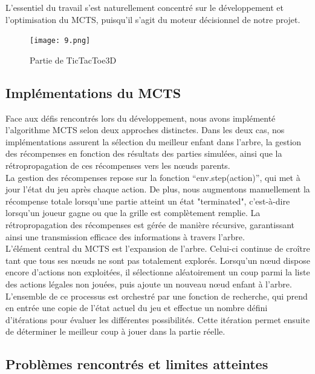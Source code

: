 \documentclass{article}
\begin{document}
\quad L'essentiel du travail s'est naturellement concentré sur le développement et l'optimisation du MCTS, puisqu'il s'agit du moteur décisionnel de notre projet.

\begin{figure}[ht]
    \centering
    \texttt{[image: 9.png]}
    \caption{Partie de TicTacToe3D}
\end{figure}

\subsection{Implémentations du MCTS}

\quad Face aux défis rencontrés lors du développement, nous avons implémenté l’algorithme MCTS selon deux approches distinctes. Dans les deux cas, nos implémentations assurent la sélection du meilleur enfant dans l’arbre, la gestion des récompenses en fonction des résultats des parties simulées, ainsi que la rétropropagation de ces récompenses vers les nœuds parents.\\

La gestion des récompenses repose sur la fonction “env.step(action)”, qui met à jour l'état du jeu après chaque action. De plus, nous augmentons manuellement la récompense totale lorsqu’une partie atteint un état "terminated", c’est-à-dire lorsqu’un joueur gagne ou que la grille est complètement remplie. La rétropropagation des récompenses est gérée de manière récursive, garantissant ainsi une transmission efficace des informations à travers l’arbre.\\

L’élément central du MCTS est l’expansion de l’arbre. Celui-ci continue de croître tant que tous ses nœuds ne sont pas totalement explorés. Lorsqu’un nœud dispose encore d’actions non exploitées, il sélectionne aléatoirement un coup parmi la liste des actions légales non jouées, puis ajoute un nouveau nœud enfant à l’arbre.\\

L’ensemble de ce processus est orchestré par une fonction de recherche, qui prend en entrée une copie de l’état actuel du jeu et effectue un nombre défini d’itérations pour évaluer les différentes possibilités. Cette itération permet ensuite de déterminer le meilleur coup à jouer dans la partie réelle.

\subsection{Problèmes rencontrés et limites atteintes}
\end{document}
